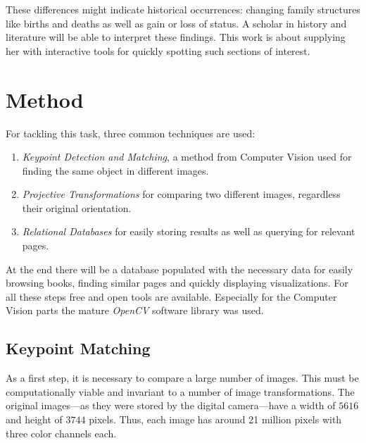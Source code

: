 \documentclass{ltjarticle}
\begin{document}
These differences might indicate historical occurrences: changing family structures like births and deaths as well as gain or loss of status. A scholar in history and literature will be able to interpret these findings. This work is about supplying her with interactive tools for quickly spotting such sections of interest.

\section{Method}

For tackling this task, three common techniques are used:

\begin{enumerate}
    \item \emph{Keypoint Detection and Matching}, a method from Computer Vision used for finding the same object in different images.
    \item \emph{Projective Transformations} for comparing two different images, regardless their original orientation.
    \item \emph{Relational Databases} for easily storing results as well as querying for relevant pages.
\end{enumerate}

At the end there will be a database populated with the necessary data for easily browsing books, finding similar pages and quickly displaying visualizations. For all these steps free and open tools are available. Especially for the Computer Vision parts the mature \emph{OpenCV} software library was used.\cite{opencv_library}

\subsection{Keypoint Matching}
\label{sec:keypoint-matching}

As a first step, it is necessary to compare a large number of images. This must be computationally viable and invariant to a number of image transformations. The original images---as they were stored by the digital camera---have a width of $5616$ and height of $3744$ pixels. Thus, each image has around 21 million pixels with three color channels each.
\end{document}
